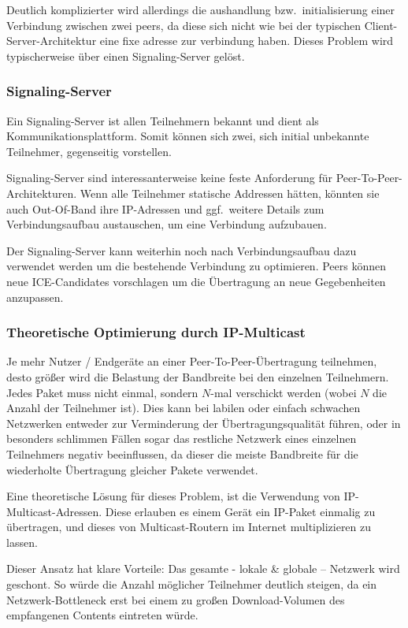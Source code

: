 \documentclass{article}
\begin{document}
\begin{onecolumn}
Deutlich komplizierter wird allerdings die aushandlung bzw.\ initialisierung
einer Verbindung zwischen zwei peers, da diese sich nicht wie bei der typischen
Client-Server-Architektur eine fixe adresse zur verbindung haben. Dieses
Problem wird typischerweise über einen Signaling-Server gelöst.

\subsubsection{Signaling-Server}
Ein Signaling-Server ist allen Teilnehmern bekannt und dient als
Kommunikationsplattform. Somit können sich zwei, sich initial unbekannte
Teilnehmer, gegenseitig vorstellen.

Signaling-Server sind interessanterweise keine feste Anforderung für
Peer-To-Peer-Architekturen. Wenn alle Teilnehmer statische Addressen hätten,
könnten sie auch Out-Of-Band ihre IP-Adressen und ggf.\ weitere Details zum
Verbindungsaufbau austauschen, um eine Verbindung aufzubauen.

Der Signaling-Server kann weiterhin noch nach Verbindungsaufbau dazu verwendet
werden um die bestehende Verbindung zu optimieren. Peers können neue
ICE-Candidates vorschlagen um die Übertragung an neue Gegebenheiten anzupassen.

\subsubsection{Theoretische Optimierung durch IP-Multicast}

Je mehr Nutzer / Endgeräte an einer Peer-To-Peer-Übertragung teilnehmen, desto
größer wird die Belastung der Bandbreite bei den einzelnen Teilnehmern. Jedes
Paket muss nicht einmal, sondern $N$-mal verschickt werden (wobei $N$ die
Anzahl der Teilnehmer ist). Dies kann bei labilen oder einfach schwachen
Netzwerken entweder zur Verminderung der Übertragungsqualität führen, oder in
besonders schlimmen Fällen sogar das restliche Netzwerk eines einzelnen
Teilnehmers negativ beeinflussen, da dieser die meiste Bandbreite für die
wiederholte Übertragung gleicher Pakete verwendet.

Eine theoretische Lösung für dieses Problem, ist die Verwendung von
IP-Multicast-Adressen. Diese erlauben es einem Gerät ein IP-Paket einmalig zu
übertragen, und dieses von Multicast-Routern im Internet multiplizieren zu
lassen.

Dieser Ansatz hat klare Vorteile: Das gesamte - lokale \& globale – Netzwerk
wird geschont. So würde die Anzahl möglicher Teilnehmer deutlich steigen, da
ein Netzwerk-Bottleneck erst bei einem zu großen Download-Volumen des
empfangenen Contents eintreten würde.


\end{onecolumn}
\end{document}
